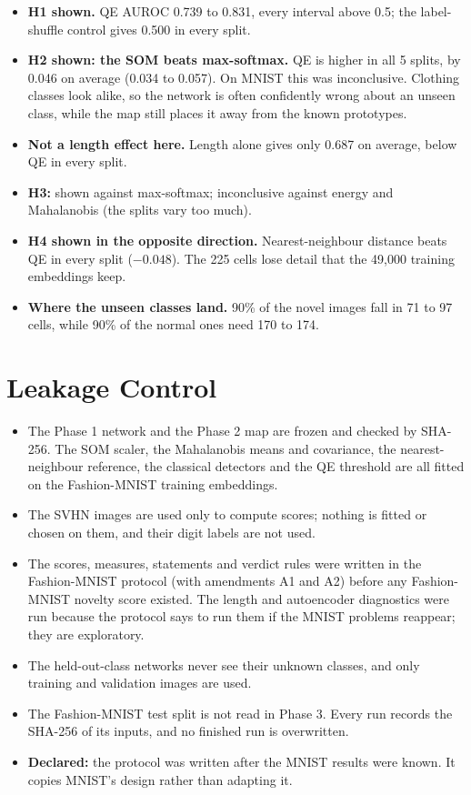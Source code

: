 \documentclass[11pt]{article}
\begin{document}
\begin{itemize}[leftmargin=1.4em, itemsep=2pt]
\item \textbf{H1 shown.} QE AUROC 0.739 to 0.831, every interval above 0.5; the label-shuffle control gives 0.500 in every split.
\item \textbf{H2 shown: the SOM beats max-softmax.} QE is higher in all 5 splits, by 0.046 on average (0.034 to 0.057). On MNIST this was inconclusive. Clothing classes look alike, so the network is often confidently wrong about an unseen class, while the map still places it away from the known prototypes.
\item \textbf{Not a length effect here.} Length alone gives only 0.687 on average, below QE in every split.
\item \textbf{H3:} shown against max-softmax; inconclusive against energy and Mahalanobis (the splits vary too much).
\item \textbf{H4 shown in the opposite direction.} Nearest-neighbour distance beats QE in every split ($-0.048$). The 225 cells lose detail that the 49,000 training embeddings keep.
\item \textbf{Where the unseen classes land.} 90\% of the novel images fall in 71 to 97 cells, while 90\% of the normal ones need 170 to 174.
\end{itemize}

\section{Leakage Control}

\begin{itemize}
  \item The Phase 1 network and the Phase 2 map are frozen and checked by SHA-256. The SOM scaler, the Mahalanobis means and covariance, the nearest-neighbour reference, the classical detectors and the QE threshold are all fitted on the Fashion-MNIST training embeddings.
  \item The SVHN images are used only to compute scores; nothing is fitted or chosen on them, and their digit labels are not used.
  \item The scores, measures, statements and verdict rules were written in the Fashion-MNIST protocol (with amendments A1 and A2) before any Fashion-MNIST novelty score existed. The length and autoencoder diagnostics were run because the protocol says to run them if the MNIST problems reappear; they are exploratory.
  \item The held-out-class networks never see their unknown classes, and only training and validation images are used.
  \item The Fashion-MNIST test split is not read in Phase 3. Every run records the SHA-256 of its inputs, and no finished run is overwritten.
  \item \textbf{Declared:} the protocol was written after the MNIST results were known. It copies MNIST's design rather than adapting it.
\end{itemize}
\end{document}
